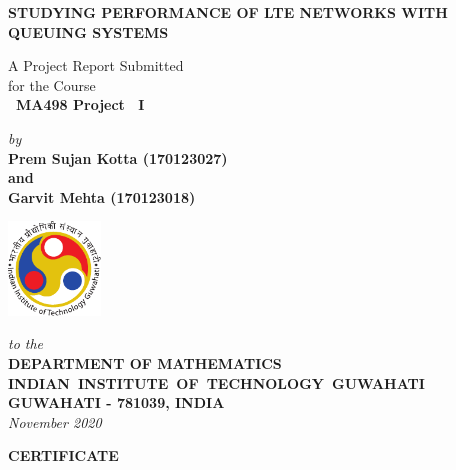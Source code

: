 \documentclass[12pt,a4paper]{report}
\theoremstyle{plain}
\theoremstyle{definition}
\theoremstyle{remark}
\begin{document}


\begin{titlepage}
\enlargethispage{3cm}

\begin{center}

\vspace*{-2cm}

\textbf{\Large STUDYING PERFORMANCE OF LTE NETWORKS WITH QUEUING SYSTEMS }

\vfill

 A Project Report Submitted \\
for the Course \\[1cm]

{\bf\Large\ MA498 Project ~I }\\[.1in]

 \vfill

{\large \emph{by}}\\[5pt]
{\large\bf {Prem Sujan Kotta (170123027)}}\\[5pt]
{\large\bf{and}}\\[5pt]
{\large\bf Garvit Mehta (170123018)}

\vfill
\includegraphics[height=2.5cm]{iitglogo}

\vspace*{0.5cm}

{\em\large to the}\\[10pt]
{\bf\large DEPARTMENT OF MATHEMATICS} \\[5pt]
{\bf\large \mbox{INDIAN INSTITUTE OF TECHNOLOGY GUWAHATI}}\\[5pt]
{\bf\large GUWAHATI - 781039, INDIA}\\[10pt]
{\it\large November 2020}
\end{center}

\end{titlepage}

\clearpage

 \setcounter{page}{2}
\begin{center}
{\Large{\bf{CERTIFICATE}}}
\end{center}
\end{document}
